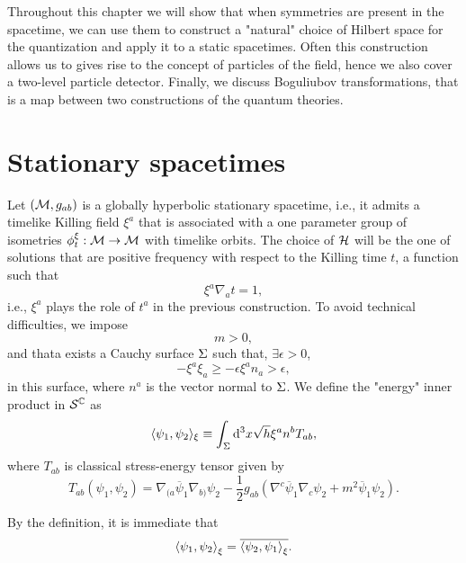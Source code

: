 Throughout this chapter we will show that when symmetries are present in the spacetime, we can use them to construct a "natural" choice of Hilbert space for the quantization and apply it to a static spacetimes. Often this construction allows us to gives rise to the concept of particles of the field, hence we also cover a two-level particle detector. Finally, we discuss Boguliubov transformations, that is a map between two constructions of the quantum theories.

\section{Stationary spacetimes}
Let \(({\mathcal{M}},g_{ab})\) is a globally hyperbolic stationary spacetime, i.e., it admits a timelike Killing field \(\xi^a\) that is associated with a one parameter group of isometries \(\phi_t^{\xi}:{\mathcal{M}}\to{\mathcal{M}}\) with timelike orbits. The choice of \({\mathcal{H}}\) will be the one of solutions that are positive frequency with respect to the Killing time \(t\), a function such that
\begin{equation}
    \xi^a\nabla_a t=1,
\end{equation}
i.e., \(\xi^a\) plays the role of \(t^a\) in the previous construction. To avoid technical difficulties, we impose
\begin{equation}\label{eq:cond1}
    m>0,
\end{equation}
and thata exists a Cauchy surface \(\Sigma\) such that, \(\exists\epsilon>0\),
\begin{equation}
    -\xi^a\xi_a\geq-\epsilon\xi^an_a>\epsilon,
    \label{eq:cond2}
\end{equation}
in this surface, where \(n^a\) is the vector normal to \(\Sigma\). We define the "energy" inner product in \({\mathcal{S}}^{\mathbb{C}}\) as
\begin{equation}
    \langle\psi_1,\psi_2\rangle_{\xi}\equiv\int_{\Sigma}\mathrm{d}^3x\sqrt{h}\xi^an^bT_{ab},
\end{equation}
where \(T_{ab}\) is classical stress-energy tensor given by
\begin{equation}
    T_{ab}(\psi_1,\psi_2)=\nabla_{(a}\overline{\psi}_1\nabla_{b)}\psi_2-\frac{1}{2}g_{ab}\left(\nabla^c\overline{\psi}_1\nabla_c\psi_2+m^2\overline{\psi}_1\psi_2\right).
\end{equation}

By the definition, it is immediate that
\begin{equation}
    \left\langle \psi_1,\psi_2\right\rangle_{\xi}=\overline{\left\langle \psi_2,\psi_1\right\rangle_{\xi}}.
\end{equation}

